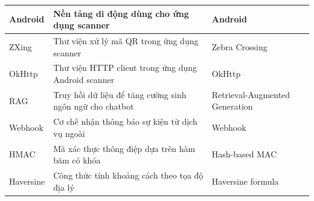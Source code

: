 \documentclass[../DoAn.tex]{subfiles}
\begin{document}
\begin{longtable}{|L{2.2cm}|L{7.1cm}|L{4.4cm}|}
\hline
Android & Nền tảng di động dùng cho ứng dụng scanner & Android \\
\hline
ZXing & Thư viện xử lý mã QR trong ứng dụng scanner & Zebra Crossing \\
\hline
OkHttp & Thư viện HTTP client trong ứng dụng Android scanner & OkHttp \\
\hline
RAG & Truy hồi dữ liệu để tăng cường sinh ngôn ngữ cho chatbot & Retrieval-Augmented Generation \\
\hline
Webhook & Cơ chế nhận thông báo sự kiện từ dịch vụ ngoài & Webhook \\
\hline
HMAC & Mã xác thực thông điệp dựa trên hàm băm có khóa & Hash-based MAC \\
\hline
Haversine & Công thức tính khoảng cách theo tọa độ địa lý & Haversine formula \\
\hline
\end{longtable}
\endgroup
\end{document}
